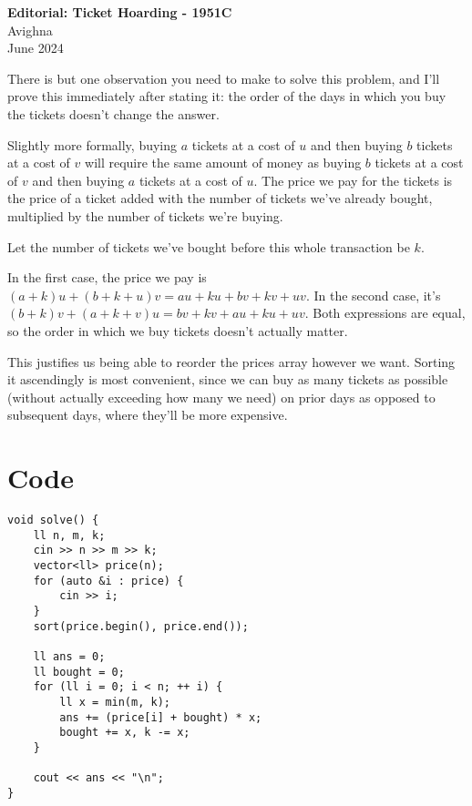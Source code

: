\documentclass{article}
\begin{document}
\begin{center}
  \large{\textbf{Editorial: Ticket Hoarding - 1951C}}\\
  \vspace{0.2em}
  \large{Avighna}\\
  \vspace{0.2em}
  \large{June 2024}
\end{center}

There is but one observation you need to make to solve this problem, and I'll prove this immediately after stating it: the order of the days in which you buy the tickets doesn't change the answer.

Slightly more formally, buying $a$ tickets at a cost of $u$ and then buying $b$ tickets at a cost of $v$ will require the same amount of money as buying $b$ tickets at a cost of $v$ and then buying $a$ tickets at a cost of $u$. The price we pay for the tickets is the price of a ticket added with the number of tickets we've already bought, multiplied by the number of tickets we're buying.

Let the number of tickets we've bought before this whole transaction be $k$.

In the first case, the price we pay is $(a+k)u + (b+k+u)v = au + ku + bv + kv + uv$. In the second case, it's $(b+k)v + (a+k+v)u = bv+kv+au+ku+uv$. Both expressions are equal, so the order in which we buy tickets doesn't actually matter.

This justifies us being able to reorder the prices array however we want. Sorting it ascendingly is most convenient, since we can buy as many tickets as possible (without actually exceeding how many we need) on prior days as opposed to subsequent days, where they'll be more expensive.

\section{Code}
\begin{verbatim}
void solve() {
    ll n, m, k;
    cin >> n >> m >> k;
    vector<ll> price(n);
    for (auto &i : price) {
        cin >> i;
    }
    sort(price.begin(), price.end());

    ll ans = 0;
    ll bought = 0;
    for (ll i = 0; i < n; ++ i) {
        ll x = min(m, k);
        ans += (price[i] + bought) * x;
        bought += x, k -= x;
    }

    cout << ans << "\n";
}
\end{verbatim}
\end{document}
